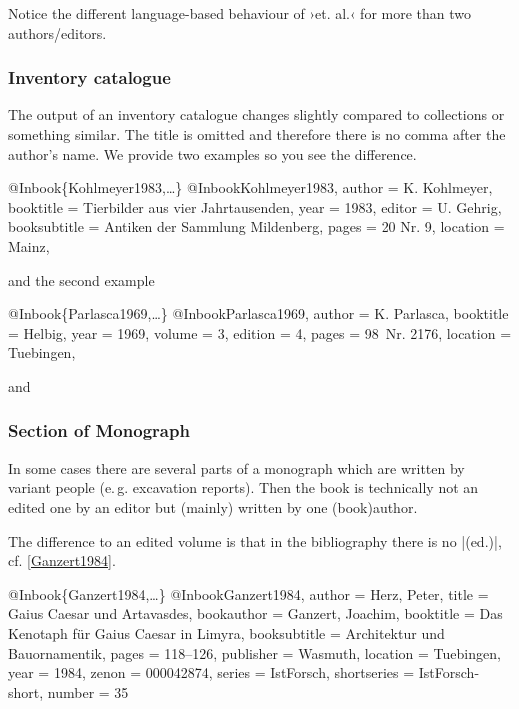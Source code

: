 \documentclass[a4paper,
10pt,
greek,
french,
spanish,
italian,
ngerman,
english
]{ltxdoc}
\begin{document}
Notice the different language-based behaviour of ›et. al.‹ for more than two authors/editors.

 
\subsubsection{Inventory catalogue}
The output of an inventory catalogue changes slightly compared to collections or something similar. 
The title is omitted and therefore there is no comma after the author’s name.
We provide two examples so you see the difference.
\begin{bibexample}[label=Kohlmeyer1983]{{@}Inbook\{Kohlmeyer1983,…\}}
@Inbook{Kohlmeyer1983,
  author       = {K. Kohlmeyer},
  booktitle    = {Tierbilder aus vier Jahrtausenden},
  year         = {1983},
  editor       = {U. Gehrig},
  booksubtitle = {Antiken der Sammlung Mildenberg},
  pages        = {20 Nr. 9},
  location     = Mainz, %
}
\end{bibexample}
and the second example

\begin{bibexample}[label=Parlasca1969]{{@}Inbook\{Parlasca1969,…\}}
@Inbook{Parlasca1969,
  author    = {K. Parlasca},
  booktitle = {Helbig},
  year      = {1969},
  volume    = {3},
  edition   = {4},
  pages     = {98\psq\ Nr. 2176},
  location  = Tuebingen, %
}
\end{bibexample}


and

\subsubsection{Section of Monograph}
In some cases there are several parts of a monograph which are written by variant people (e.\,g. excavation reports). 
Then the book is technically not an edited one by an editor but (mainly) written by one (book)author. 

The difference to an edited volume is that in the bibliography   there is no |(ed.)|, cf. \cref{Ganzert1984}.


\begin{bibexample}[label=Ganzert1984]{{@}Inbook\{Ganzert1984,…\}}
@Inbook{Ganzert1984,
author = {Herz, Peter},
title = {Gaius Caesar und Artavasdes},
bookauthor = {Ganzert, Joachim},
booktitle = {Das Kenotaph für Gaius Caesar in Limyra},
booksubtitle = {Architektur und Bauornamentik},
pages = {118--126},
publisher = {Wasmuth},
location = Tuebingen,
year = {1984},
zenon = {000042874},
series = IstForsch,
shortseries = IstForsch-short,
number = {35}
}
\end{bibexample}
\end{document}
